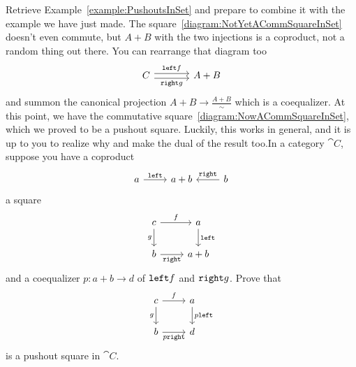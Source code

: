\begin{exercise}
  Retrieve Example~\ref{example:PushoutsInSet} and prepare to combine
  it with the example we have just made. The
  square~\eqref{diagram:NotYetACommSquareInSet} doesn't even commute,
  but \(A+B\) with the two injections is a coproduct, not a random
  thing out there. You can rearrange that diagram too
  \[\begin{tikzcd}[column sep=large]
      C \ar["{\linj f}",r, shift left] \ar["{\rinj g}", r, shift
      right, swap] & A+B
    \end{tikzcd}\] and summon the canonical projection
  \(A+B \to \frac{A+B}{\sim}\) which is a coequalizer. At this point, we
  have the commutative square~\eqref{diagram:NowACommSquareInSet},
  which we proved to be a pushout square. Luckily, this works in
  general, and it is up to you to realize why and make the dual of the
  result too.\newline In a category \(\cat C\), suppose you have a coproduct
  \[\begin{tikzcd}a \ar["{\linj}", r] & a+b & b \ar["{\rinj}", l,
      swap]\end{tikzcd}\] a square
  \[\begin{tikzcd}
      c \ar["f", r] \ar["g", d, swap]  & a \ar["\linj", d] \\
      b \ar["\rinj", r, swap] & a+b
    \end{tikzcd}\] and a coequalizer \(p : a+b \to d\) of \(\mathtt{left} f\)
  and \(\mathtt{right} g\). Prove that
  \[\begin{tikzcd}
      c \ar["f", r] \ar["g", d, swap]  & a \ar["p\linj", d] \\
      b \ar["p\rinj", r, swap] & d
    \end{tikzcd}\] is a pushout square in \(\cat
  C\).%
\end{exercise}



